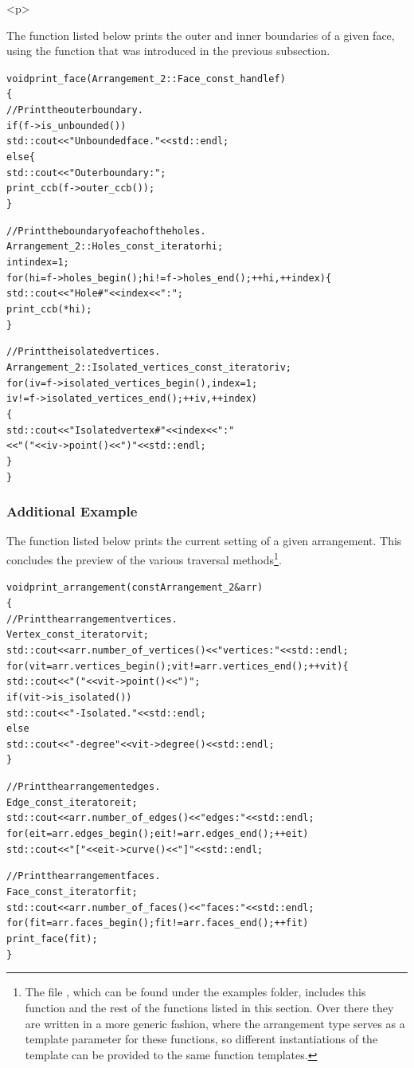 \begin{ccHtmlOnly}<p>\end{ccHtmlOnly}
The function listed below prints the outer and inner boundaries of a
given face, using the function  that was
introduced in the previous subsection.
\begin{alltt}
void print_face (Arrangement_2::Face_const_handle f)
\{
  // Print the outer boundary.
  if (f->is_unbounded())
    std::cout << "Unbounded face. " << std::endl;
  else \{
    std::cout << "Outer boundary: ";
    print_ccb (f->outer_ccb());
  \}

  // Print the boundary of each of the holes.
  Arrangement_2::Holes_const_iterator hi;
  int                                 index = 1;
  for (hi = f->holes_begin(); hi != f->holes_end(); ++hi, ++index) \{
    std::cout << "    Hole #" << index << ": ";
    print_ccb (*hi);
  \}

  // Print the isolated vertices.
  Arrangement_2::Isolated_vertices_const_iterator iv;
  for (iv = f->isolated_vertices_begin(), index = 1;
       iv != f->isolated_vertices_end(); ++iv, ++index)
  \{
    std::cout << "    Isolated vertex #" << index << ": "
              << "(" << iv->point() << ")" << std::endl;
  \}
\}
\end{alltt}

\subsubsection{Additional Example}
\label{arr_sssec:tr_ex}
%
The function listed below prints the current setting of a given
arrangement. This concludes the preview of the various traversal
methods\footnote{The file , which can be
found under the examples folder, includes this function and the
rest of the functions listed in this section. Over there they are
written in a more generic fashion, where the arrangement type
serves as a template parameter for these functions, so different
instantiations of the  template
can be provided to the same function templates.}.
\begin{alltt}
void print_arrangement (const Arrangement_2& arr)
\{
  // Print the arrangement vertices.
  Vertex_const_iterator vit;
  std::cout << arr.number_of_vertices() << " vertices:" << std::endl;
  for (vit = arr.vertices_begin(); vit != arr.vertices_end(); ++vit) \{
    std::cout << "(" << vit->point() << ")";
    if (vit->is_isolated())
      std::cout << " - Isolated." << std::endl;
    else
      std::cout << " - degree " << vit->degree() << std::endl;
  \}

  // Print the arrangement edges.
  Edge_const_iterator eit;
  std::cout << arr.number_of_edges() << " edges:" << std::endl;
  for (eit = arr.edges_begin(); eit != arr.edges_end(); ++eit)
    std::cout << "[" << eit->curve() << "]" << std::endl;

  // Print the arrangement faces.
  Face_const_iterator fit;
  std::cout << arr.number_of_faces() << " faces:" << std::endl;
  for (fit = arr.faces_begin(); fit != arr.faces_end(); ++fit)
    print_face (fit);
\}
\end{alltt}


